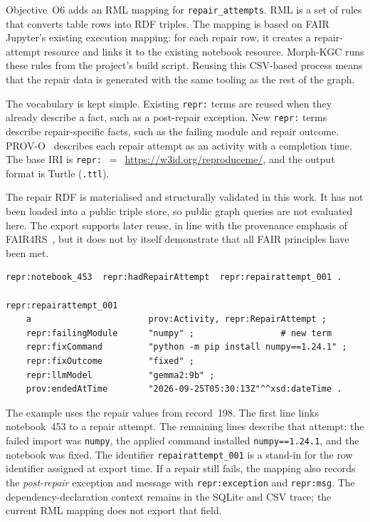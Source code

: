 Objective~O6 adds an RML mapping for \texttt{repair\_attempts}. RML is a
set of rules that converts table rows into RDF triples. The mapping is based
on FAIR Jupyter's existing execution mapping: for each repair row, it creates
a repair-attempt resource and links it to the existing notebook resource.
Morph-KGC runs these rules from the project's build script. Reusing this
CSV-based process means that the repair data is generated with the same
tooling as the rest of the graph.

The vocabulary is kept simple. Existing \texttt{repr:} terms are reused when
they already describe a fact, such as a post-repair exception. New
\texttt{repr:} terms describe repair-specific facts, such as the failing
module and repair outcome. PROV-O~\cite{provenance2013} describes each repair
attempt as an activity with a completion time. The base IRI is
\texttt{repr:}~$=$~\url{https://w3id.org/reproduceme/}, and the output format
is Turtle (\texttt{.ttl}).

The repair RDF is materialised and structurally validated in this work. It
has not been loaded into a public triple store, so public graph queries are
not evaluated here. The export supports later reuse, in line with the
provenance emphasis of FAIR4RS~\cite{barker2022fair4rs}, but it does not by
itself demonstrate that all FAIR principles have been met.

\begin{verbatim}
repr:notebook_453  repr:hadRepairAttempt  repr:repairattempt_001 .

repr:repairattempt_001
    a                       prov:Activity, repr:RepairAttempt ;
    repr:failingModule      "numpy" ;                 # new term
    repr:fixCommand         "python -m pip install numpy==1.24.1" ;
    repr:fixOutcome         "fixed" ;
    repr:llmModel           "gemma2:9b" ;
    prov:endedAtTime        "2026-09-25T05:30:13Z"^^xsd:dateTime .
\end{verbatim}

The example uses the repair values from record~198. The first line links
notebook~453 to a repair attempt. The remaining lines describe that attempt:
the failed import was \texttt{numpy}, the applied command installed
\texttt{numpy==1.24.1}, and the notebook was fixed. The identifier
\texttt{repairattempt\_001} is a stand-in for the row identifier assigned at
export time. If a repair still fails, the mapping also records the
\emph{post-repair} exception and message with \texttt{repr:exception} and
\texttt{repr:msg}. The dependency-declaration context remains in the SQLite
and CSV trace; the current RML mapping does not export that field.

